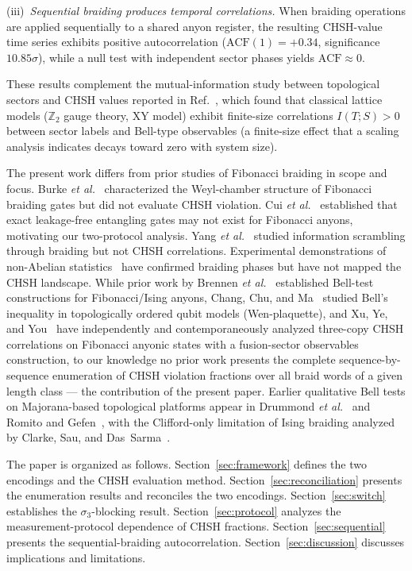 \documentclass[aps,pra,twocolumn,superscriptaddress,longbibliography,floatfix,nofootinbib]{revtex4-2}
\begin{document}
(iii)~\emph{Sequential braiding produces temporal correlations.}
When braiding operations are applied sequentially to a shared
anyon register, the resulting CHSH-value time series exhibits
positive autocorrelation ($\text{ACF}(1)=+0.34$, significance
$10.85\sigma$), while a null test with independent sector phases
yields $\text{ACF}\approx 0$.

These results complement the mutual-information study
between topological sectors and CHSH values reported in
Ref.~\cite{Sayim2026topological}, which found that classical lattice
models ($\mathbb{Z}_2$ gauge theory, XY model) exhibit
finite-size correlations $I(T;S)>0$ between sector labels and
Bell-type observables (a finite-size effect that a scaling analysis
indicates decays toward zero with system size).

The present work differs from prior studies of Fibonacci braiding
in scope and focus.
Burke \emph{et al.}~\cite{Burke2024} characterized the Weyl-chamber
structure of Fibonacci braiding gates but did not evaluate
CHSH violation.
Cui \emph{et al.}~\cite{Cui2019} established that exact
leakage-free entangling gates may not exist for Fibonacci anyons,
motivating our two-protocol analysis.
Yang \emph{et al.}~\cite{Yang2019} studied information scrambling
through braiding but not CHSH correlations.
Experimental demonstrations of non-Abelian
statistics~\cite{Google2023} have confirmed braiding phases
but have not mapped the CHSH landscape.
While prior work by Brennen \emph{et al.}~\cite{Brennen2009} established Bell-test
constructions for Fibonacci/Ising anyons, Chang, Chu, and
Ma~\cite{ChangChuMa2017} studied Bell's inequality in topologically
ordered qubit models (Wen-plaquette), and Xu, Ye, and
You~\cite{Xu2025} have independently and contemporaneously analyzed
three-copy CHSH correlations on Fibonacci anyonic states with a
fusion-sector observables construction, to our knowledge no prior work
presents the complete sequence-by-sequence enumeration of CHSH violation
fractions over all braid words of a given length class --- the contribution
of the present paper. Earlier qualitative Bell tests on Majorana-based
topological platforms appear in Drummond \emph{et al.}~\cite{Drummond2014}
and Romito and Gefen~\cite{RomitoGefen2017}, with the Clifford-only
limitation of Ising braiding analyzed by Clarke, Sau, and
Das~Sarma~\cite{ClarkeSauDasSarma2016}.

The paper is organized as follows.
Section~\ref{sec:framework} defines the two encodings and
the CHSH evaluation method.
Section~\ref{sec:reconciliation} presents the enumeration
results and reconciles the two encodings.
Section~\ref{sec:switch} establishes the $\sigma_3$-blocking result.
Section~\ref{sec:protocol} analyzes the measurement-protocol
dependence of CHSH fractions.
Section~\ref{sec:sequential} presents the sequential-braiding
autocorrelation.
Section~\ref{sec:discussion} discusses implications and limitations.
\end{document}
